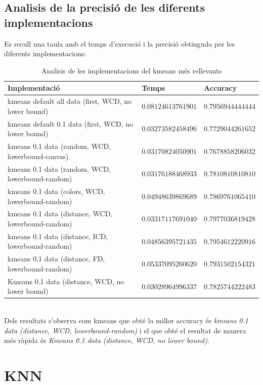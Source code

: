 \documentclass[a4paper, 11pt]{article}
\begin{document}
\subsection{Analisis de la precisió de les diferents implementacions}
Es recull una taula amb el temps d'execució i la precisió obtinguda per les diferents implementacions:
\begin{table}[h]
    \centering
    \begin{tabular}{ l | l | l }
        \textbf{Implementació} & \textbf{Temps} & \textbf{Accuracy} \\\hline\hline
        kmeans default all data (first, WCD, no lower bound) & $0.08124613761901$ & $0.7956944444444$ \\ \hdashline
        kmeans default 0.1 data (first, WCD, no lower bound) & $0.03273582458496$ & $0.7729044261652$ \\ \hdashline
        kmeans 0.1 data (random, WCD, lowerbound-canvas) & $0.03170824050901$ & $0.7678858206032$ \\ \hdashline
        kmeans 0.1 data (random, WCD, lowerbound-random) & $0.03176188468933$ & $0.7810810810810$ \\ \hdashline
        kmeans 0.1 data (colors, WCD, lowerbound-random) & $0.04948639869689$ & $0.7869761065410$ \\ \hdashline
        kmeans 0.1 data (distance, WCD, lowerbound-random) & $0.03317117691040$ & $0.7977036819428$ \\ \hdashline 
        kmeans 0.1 data (distance, ICD, lowerbound-random) & $0.04856395721435$ & $0.7954612220916$ \\ \hdashline 
        kmeans 0.1 data (distance, FD, lowerbound-random) & $0.05337095260620$ & $0.7931502154321$ \\ \hdashline 
        Kmeans 0.1 data (distance, WCD, no lower bound) & $0.03028964996337$ & $0.7825744222483$ 
    \end{tabular}
    \caption{Analisis de les implementacions del kmeans més rellevants}
    \label{tab:resultats_kmeans}
\end{table}\\
Dels resultats s'observa com kmeans que obté la millor accuracy és \textit{kmeans 0.1 data (distance, WCD, lowerbound-random)} i el que obté el resultat de manera més ràpida és \textit{Kmeans 0.1 data (distance, WCD, no lower bound)}. 

\newpage

\section{KNN}
\end{document}

